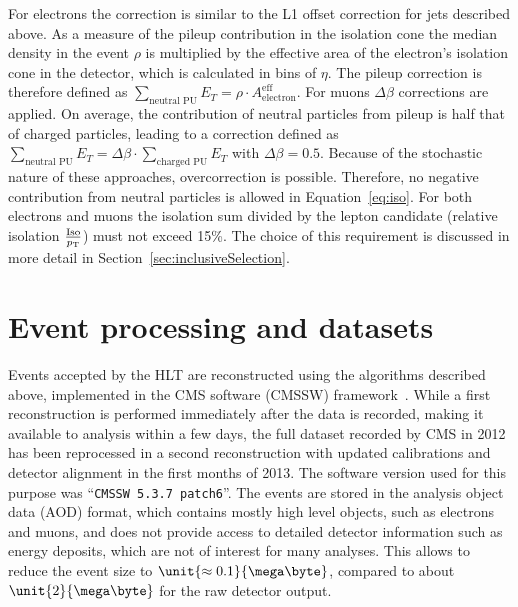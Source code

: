 For electrons the correction is similar to the L1 offset correction for jets described above. As a measure of the pileup contribution in the isolation cone the median \pt density in the event $\rho$ is multiplied by the effective area of the electron's isolation cone in the detector, which is calculated in bins of $\eta$. The pileup correction is therefore defined as $\sum\limits_{\text{neutral PU}} E_T = \rho\cdot A^{\text{eff}}_{\text{electron}}$. For muons $\Delta \beta$ corrections are applied. On average, the contribution of neutral particles from pileup is half that of charged particles, leading to a correction defined as $\sum\limits_{\text{neutral PU}} E_T = \Delta\beta\cdot \sum\limits_{\text{charged PU}} E_T$ with $\Delta\beta = 0.5$. Because of the stochastic nature of these approaches, overcorrection is possible. Therefore, no negative contribution from neutral particles is allowed in Equation~\ref{eq:iso}. For both electrons and muons the isolation sum divided by the lepton candidate \pt (relative isolation $\frac{\text{Iso}}{p_{\mathrm{T}}}$) must not exceed  15\%. The choice of this requirement is discussed in more detail in Section~\ref{sec:inclusiveSelection}.

 
\section{Event processing and datasets}
Events accepted by the HLT are reconstructed using the algorithms described above, implemented in the CMS software (CMSSW) framework~\cite{PTDR1,SWGuideCMSSW}. While a first reconstruction is performed immediately after the data is recorded, making it available to analysis within a few days, the full dataset recorded by CMS in 2012 has been reprocessed in a second reconstruction with updated calibrations and detector alignment in the first months of 2013. The software version used for this purpose was ``\verb+CMSSW 5.3.7 patch6+''. The events are stored in the analysis object data (AOD) format, which contains mostly high level objects, such as electrons and muons, and does not provide access to detailed detector information such as energy deposits, which are not of interest for many analyses. This allows to reduce the event size to $\unit{\approx0.1}{\mega\byte}$, compared to about $\unit{2}{\mega\byte}$ for the raw detector output. 

